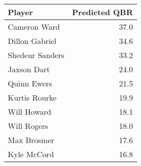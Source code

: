 \begin{tabular}{l|r}
Player & Predicted QBR \\
  \hline
Cameron Ward & 37.0 \\ 
  Dillon Gabriel & 34.6 \\ 
  Shedeur Sanders & 33.2 \\ 
  Jaxson Dart & 24.0 \\ 
  Quinn Ewers & 21.5 \\ 
  Kurtis Rourke & 19.9 \\ 
  Will Howard & 18.1 \\ 
  Will Rogers & 18.0 \\ 
  Max Brosmer & 17.6 \\ 
  Kyle McCord & 16.8 \\ 
\end{tabular}
